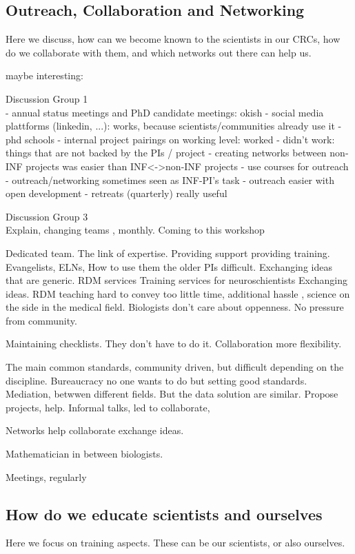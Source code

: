 \documentclass{eceasst}
\begin{document}
\subsection{Outreach, Collaboration and Networking}
Here we discuss, how can we become known to the scientists in our CRCs, how do we collaborate with them, and which networks out there can help us.

maybe interesting: \cite{Hausen_Rosenberg_Trautwein-Bruns_Schwarz_2020}

Discussion Group 1\\

- annual status meetings and PhD candidate meetings: okish
- social media plattforms (linkedin, ...): works, because scientists/communities already use it
- phd schools
- internal project pairings on working level: worked
- didn't work: things that are not backed by the PIs / project
- creating networks between non-INF projects was easier than INF<->non-INF projects
- use courses for outreach
- outreach/networking sometimes seen as INF-PI's task
- outreach easier with open development
- retreats (quarterly) really useful

Discussion Group 3\\

Explain, changing teams , monthly. Coming to this workshop

Dedicated team. The link of expertise. Providing support providing training. Evangelists, ELNs,
How to use them the older PIs difficult. Exchanging ideas that are generic.
RDM services
Training services for neuroschientists
Exchanging ideas.
RDM teaching hard to convey too little time, additional hassle , science on the side in the medical field. Biologists don't care about oppenness. No pressure from community.

Maintaining checklists. They don't have to do it. Collaboration more flexibility.

The main common standards, community driven, but difficult depending on the discipline. Bureaucracy no one wants to do but setting good standards. Mediation, betwwen different fields. But the data solution are similar. Propose projects, help. Informal talks, led to collaborate,

Networks help collaborate exchange ideas.

Mathematician in between biologists.

Meetings, regularly

\subsection{How do we educate scientists and ourselves}
Here we focus on training aspects. These can be our scientists, or also ourselves.\\
\end{document}
